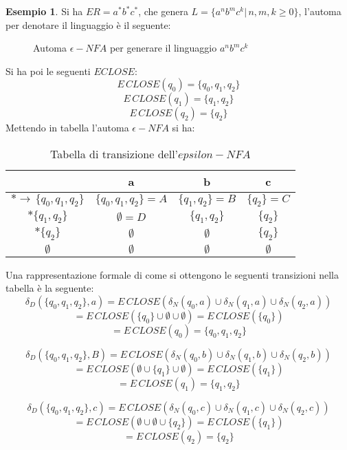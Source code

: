 \documentclass[a4paper]{book}
\theoremstyle{definition}%
\newtheorem*{esempio}{Esempio}
\begin{document}
\begin{esempio}
Si ha $ER=a^*b^*c^*$, che genera $L=\{a^nb^mc^k|\,n,m,k\geq 0\}$, l'automa per denotare il linguaggio è il seguente:
\begin{figure}
\caption{Automa $\epsilon-NFA$ per generare il linguaggio $a^nb^mc^k$}
\end{figure}
Si ha poi le seguenti $ECLOSE$:
\[ E\,CLOSE(q_0)=\{q_0,q_1,q_2\} \]
\[ E\,CLOSE(q_1)=\{q_1,q_2\} \]
\[ E\,CLOSE(q_2)=\{q_2\} \]
Mettendo in tabella l'automa $\epsilon-NFA$ si ha:
\begin{table}
\centering
\caption{Tabella di transizione dell'$epsilon-NFA$}
\begin{tabular}{c|c|c|c}
\toprule & a & b & c\\
\midrule
$*\to\,\{q_0,q_1,q_2\}$ & $\{q_0,q_1,q_2\} = A$ & $\{q_1,q_2\} = B$ & $\{q_2\} = C$\\
$*\{q_1,q_2\}$ & $\emptyset = D$ & $\{q_1,q_2\}$ & $\{q_2\}$\\
$*\{q_2\}$ & $\emptyset$ & $\emptyset$ & $\{q_2\}$\\
$\emptyset$ & $\emptyset$ & $\emptyset$ & $\emptyset$
\end{tabular}
\end{table}
Una rappresentazione formale di come si ottengono le seguenti transizioni nella tabella è la seguente:
\[ \delta_D(\{q_0,q_1,q_2\},a)=E\,CLOSE(\delta_N(q_0,a)\cup \delta_N(q_1,a)\cup \delta_N(q_2,a)) \]
\[ =E\,CLOSE(\{q_0\} \cup \emptyset\cup \emptyset)=E\,CLOSE(\{q_0\}) \]
\[ =E\,CLOSE	(q_0)=\{q_0,q_1,q_2\} \]

\[ \delta_D(\{q_0,q_1,q_2\},B)=E\,CLOSE(\delta_N(q_0,b)\cup \delta_N(q_1,b)\cup \delta_N(q_2,b)) \]
\[ =E\,CLOSE(\emptyset \cup \{q_1\}\cup \emptyset)=E\,CLOSE(\{q_1\}) \]
\[ =E\,CLOSE	(q_1)=\{q_1,q_2\} \]

\[ \delta_D(\{q_0,q_1,q_2\},c)=E\,CLOSE(\delta_N(q_0,c)\cup \delta_N(q_1,c)\cup \delta_N(q_2,c)) \]
\[ =E\,CLOSE(\emptyset \cup \emptyset\cup \{q_2\})=E\,CLOSE(\{q_1\}) \]
\[ =E\,CLOSE	(q_2)=\{q_2\} \]


\end{esempio}
\end{document}

